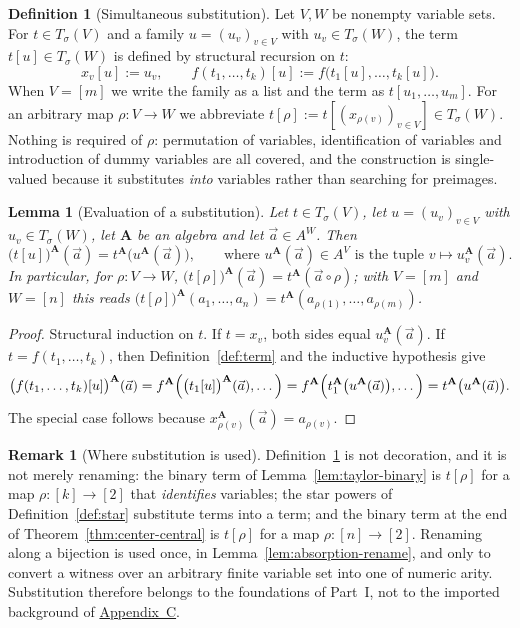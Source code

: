 \documentclass[11pt]{article}
\theoremstyle{mainplain}
\newtheorem{lemma}[theorem]{Lemma}
\theoremstyle{mainroman}
\theoremstyle{definition}
\newtheorem{definition}[theorem]{Definition}
\newtheorem{remark}[theorem]{Remark}
\numberwithin{equation}{section}
\newcommand{\bA}{\mathbf A}
\newcommand{\Tm}{T_\sigma}
\begin{document}
\begin{definition}[Simultaneous substitution]\label{def:substitution}
Let $V,W$ be nonempty variable sets. For $t\in\Tm(V)$ and a family
$u=(u_v)_{v\in V}$ with $u_v\in\Tm(W)$, the term $t[u]\in\Tm(W)$ is defined by
structural recursion on $t$:
\[
 x_v[u]:=u_v,\qquad
 f(t_1,\dots,t_k)[u]:=f\bigl(t_1[u],\dots,t_k[u]\bigr).
\]
When $V=[m]$ we write the family as a list and the term as
$t[u_1,\dots,u_m]$. For an arbitrary map $\rho:V\to W$ we abbreviate
$t[\rho]:=t[(x_{\rho(v)})_{v\in V}]\in\Tm(W)$. Nothing is required of $\rho$:
permutation of variables, identification of variables and introduction of dummy
variables are all covered, and the construction is single-valued because it
substitutes \emph{into} variables rather than searching for preimages.
\end{definition}

\begin{lemma}[Evaluation of a substitution]\label{lem:substitution-eval}
Let $t\in\Tm(V)$, let $u=(u_v)_{v\in V}$ with $u_v\in\Tm(W)$, let $\bA$ be an
algebra and let $\vec a\in A^{W}$. Then
\[
 \bigl(t[u]\bigr)^{\bA}(\vec a)
 = t^{\bA}\bigl(u^{\bA}(\vec a)\bigr),
 \qquad\text{where } u^{\bA}(\vec a)\in A^{V}
 \text{ is the tuple } v\mapsto u_v^{\bA}(\vec a).
\]
In particular, for $\rho:V\to W$,
$\bigl(t[\rho]\bigr)^{\bA}(\vec a)=t^{\bA}(\vec a\circ\rho)$; with $V=[m]$ and
$W=[n]$ this reads
$\bigl(t[\rho]\bigr)^{\bA}(a_1,\dots,a_n)=t^{\bA}(a_{\rho(1)},\dots,a_{\rho(m)})$.
\end{lemma}
\begin{proof}
Structural induction on $t$. If $t=x_v$, both sides equal $u_v^{\bA}(\vec a)$.
If $t=f(t_1,\dots,t_k)$, then Definition~\ref{def:term} and the inductive
hypothesis give
\[
 \bigl(f(t_1,\dots,t_k)[u]\bigr)^{\bA}(\vec a)
 = f^{\bA}\Bigl(\bigl(t_1[u]\bigr)^{\bA}(\vec a),\dots\Bigr)
 = f^{\bA}\Bigl(t_1^{\bA}\bigl(u^{\bA}(\vec a)\bigr),\dots\Bigr)
 = t^{\bA}\bigl(u^{\bA}(\vec a)\bigr).
\]
The special case follows because $x_{\rho(v)}^{\bA}(\vec a)=a_{\rho(v)}$.
\end{proof}

\begin{remark}[Where substitution is used]\label{rem:substitution-usage}
Definition~\ref{def:substitution} is not decoration, and it is not merely
renaming: the binary term of Lemma~\ref{lem:taylor-binary} is $t[\rho]$ for a
map $\rho:[k]\to[2]$ that \emph{identifies} variables; the star powers of
Definition~\ref{def:star} substitute terms into a term; and the binary term at
the end of Theorem~\ref{thm:center-central} is $t[\rho]$ for a map
$\rho:[n]\to[2]$. Renaming along a bijection is used once, in
Lemma~\ref{lem:absorption-rename}, and only to convert a witness over an
arbitrary finite variable set into one of numeric arity. Substitution therefore
belongs to the foundations of Part~I, not to the imported background of
\hyperref[app:background]{Appendix~C}.
\end{remark}
\end{document}
